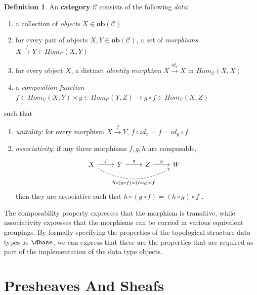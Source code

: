\documentclass[review]{vgtc}
\theoremstyle{definition}
\newtheorem{definition}{Definition}[section]
\theoremstyle{remark}
\begin{document}
\begin{definition}\label{def:atct:category}
   An \textbf{category} $\mathcal{C}$ consists of the following \textit{data}:
\begin{enumerate}
  \item a collection of \textit{objects} $X \in \textbf{ob}(\mathcal{C})$
  \item for every pair of objects $X, Y \in \textbf{ob}(\mathcal{C})$, a set of \textit{morphisms} $X \xrightarrow{f} Y \in Hom_{\mathcal{C}}(X, Y)$
  \item for every object $X$, a distinct \textit{identity morphism} $X \xrightarrow {id_x} X$ in $Hom_{\mathcal{C}}(X, X)$
  \item a \textit{composition function} $f \in Hom_{\mathcal{C}}(X, Y) \times  g \in Hom_{\mathcal{C}}(Y, Z) \rightarrow g \circ f \in Hom_{\mathcal{C}}(X, Z)$
\end{enumerate}
such that
\begin{enumerate}
  \item \textit{unitality:} for every morphism $ X \xrightarrow{f} Y$, $f \circ id_x = f = id_y \circ f$
  \item \textit{associativity:} if any three morphisms $f, g, h$ are composable,
    \begin{equation*}
      \begin{tikzcd}
        X \arrow[r, "f"] \arrow[rrr, "h\circ(g\circ f) = (h\circ g)\circ f"', bend right, dashed] & Y  \arrow[r, "g"] & Z \arrow[r, "h"] & W
        \end{tikzcd}
  \end{equation*}
  then they are associative such that $h\circ(g\circ f) = (h \circ g) \circ f$  \cite{lawvere2009conceptual,riehlCategoryTheoryContext,maclaneCategoriesWorkingMathematician2013,fongInvitationAppliedCategory2019}.
  \end{enumerate}
\end{definition}

The composability property expresses that the morphism is transitive, while associativity expresses that the morphisms can be curried in various equivalent groupings. By formally specifying the properties of the topological structure data types as $\mathcal{\dbase}$, we can express that these are the properties that are required as part of the implementation of the data type objects.


\section{Presheaves And Sheafs}





\end{document}
